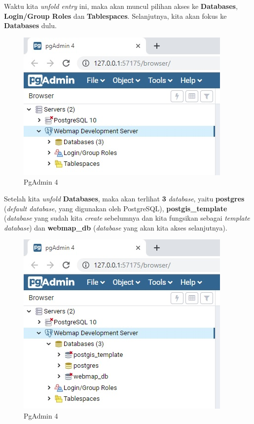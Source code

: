 \documentclass[]{book}
\begin{document}
Waktu kita \emph{unfold entry} ini, maka akan muncul pilihan akses ke \textbf{Databases}, \textbf{Login/Group Roles} dan \textbf{Tablespaces}. Selanjutnya, kita akan fokus ke \textbf{Databases} dulu.

\begin{figure}
\centering
\includegraphics{./img/pgadmin4-connection-collapsed.jpg}
\caption{PgAdmin 4}
\end{figure}

Setelah kita \emph{unfold} \textbf{Databases}, maka akan terlihat \textbf{3} \emph{database}, yaitu \textbf{postgres} (\emph{default database}, yang digunakan oleh PostgreSQL), \textbf{postgis\_template} (\emph{database} yang sudah kita \emph{create} sebelumnya dan kita fungsikan sebagai \emph{template database}) dan \textbf{webmap\_db} (\emph{database} yang akan kita akses selanjutnya).

\begin{figure}
\centering
\includegraphics{./img/pgadmin4-collapsed-show-db.jpg}
\caption{PgAdmin 4}
\end{figure}
\end{document}
